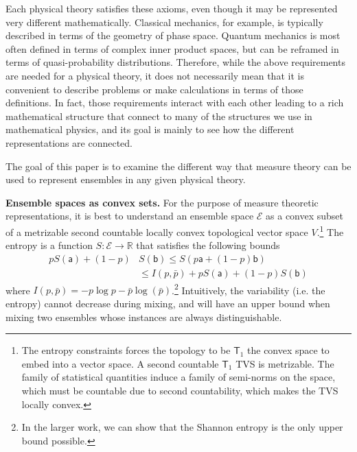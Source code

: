 \documentclass[10pt,twocolumn, nofootinbib]{revtex4-2}
\newcommand{\ens}[1][e] {\mathsf{#1}} %
\newcommand{\Ens}[1][E] {\mathcal{#1}} %
\begin{document}
Each physical theory satisfies these axioms, even though it may be represented very different mathematically. Classical mechanics, for example, is typically described in terms of the geometry of phase space. Quantum mechanics is most often defined in terms of complex inner product spaces, but can be reframed in terms of quasi-probability distributions. Therefore, while the above requirements are needed for a physical theory, it does not necessarily mean that it is convenient to describe problems or make calculations in terms of those definitions. In fact, those requirements interact with each other leading to a rich mathematical structure that connect to many of the structures we use in mathematical physics, and its goal is mainly to see how the different representations are connected.

The goal of this paper is to examine the different way that measure theory can be used to represent ensembles in any given physical theory.


\textbf{Ensemble spaces as convex sets.} For the purpose of measure theoretic representations, it is best to understand an ensemble space $\Ens$ as a convex subset of a metrizable second countable locally convex topological vector space $V$.\footnote{The entropy constraints forces the topology to be $\mathsf{T}_1$ the convex space to embed into a vector space. A second countable $\mathsf{T}_1$ TVS is metrizable. The family of statistical quantities induce a family of semi-norms on the space, which must be countable due to second countability, which makes the TVS locally convex.} The entropy is a function $S : \Ens \to \mathbb{R}$ that satisfies the following bounds
\begin{equation}
	\begin{aligned}
		p S(\ens[a]) + (1-p) &S(\ens[b]) \leq S(p \ens[a] + (1-p) \ens[b]) \\
		&\leq I(p,\bar{p}) + p S(\ens[a]) + (1-p) S(\ens[b])
	\end{aligned}
\end{equation}
where $I(p,\bar{p}) = - p \log p - \bar{p} \log(\bar{p})$.\footnote{In the larger work, we can show that the Shannon entropy is the only upper bound possible.}  Intuitively, the variability (i.e. the entropy) cannot decrease during mixing, and will have an upper bound when mixing two ensembles whose instances are always distinguishable.
\end{document}
